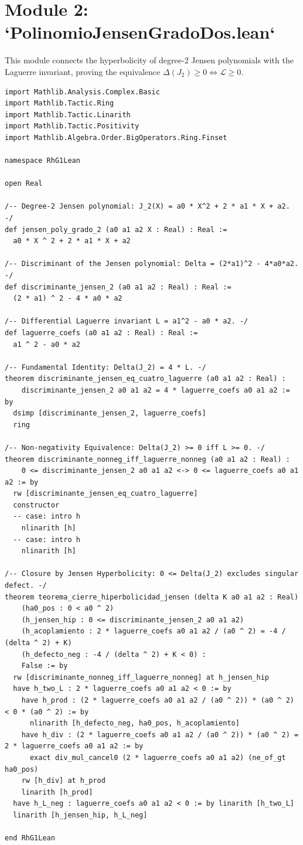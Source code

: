 \documentclass[11pt,a4paper]{article}
\theoremstyle{definition}
\theoremstyle{remark}
\begin{document}
\section{Module 2: `PolinomioJensenGradoDos.lean`}

This module connects the hyperbolicity of degree-2 Jensen polynomials with the Laguerre invariant, proving the equivalence $\Delta(J_2) \ge 0 \iff \mathcal{L} \ge 0$.

\begin{lstlisting}[language=Lean4]
import Mathlib.Analysis.Complex.Basic
import Mathlib.Tactic.Ring
import Mathlib.Tactic.Linarith
import Mathlib.Tactic.Positivity
import Mathlib.Algebra.Order.BigOperators.Ring.Finset

namespace RhG1Lean

open Real

/-- Degree-2 Jensen polynomial: J_2(X) = a0 * X^2 + 2 * a1 * X + a2. -/
def jensen_poly_grado_2 (a0 a1 a2 X : Real) : Real :=
  a0 * X ^ 2 + 2 * a1 * X + a2

/-- Discriminant of the Jensen polynomial: Delta = (2*a1)^2 - 4*a0*a2. -/
def discriminante_jensen_2 (a0 a1 a2 : Real) : Real :=
  (2 * a1) ^ 2 - 4 * a0 * a2

/-- Differential Laguerre invariant L = a1^2 - a0 * a2. -/
def laguerre_coefs (a0 a1 a2 : Real) : Real :=
  a1 ^ 2 - a0 * a2

/-- Fundamental Identity: Delta(J_2) = 4 * L. -/
theorem discriminante_jensen_eq_cuatro_laguerre (a0 a1 a2 : Real) :
    discriminante_jensen_2 a0 a1 a2 = 4 * laguerre_coefs a0 a1 a2 := by
  dsimp [discriminante_jensen_2, laguerre_coefs]
  ring

/-- Non-negativity Equivalence: Delta(J_2) >= 0 iff L >= 0. -/
theorem discriminante_nonneg_iff_laguerre_nonneg (a0 a1 a2 : Real) :
    0 <= discriminante_jensen_2 a0 a1 a2 <-> 0 <= laguerre_coefs a0 a1 a2 := by
  rw [discriminante_jensen_eq_cuatro_laguerre]
  constructor
  -- case: intro h
    nlinarith [h]
  -- case: intro h
    nlinarith [h]

/-- Closure by Jensen Hyperbolicity: 0 <= Delta(J_2) excludes singular defect. -/
theorem teorema_cierre_hiperbolicidad_jensen (delta K a0 a1 a2 : Real)
    (ha0_pos : 0 < a0 ^ 2)
    (h_jensen_hip : 0 <= discriminante_jensen_2 a0 a1 a2)
    (h_acoplamiento : 2 * laguerre_coefs a0 a1 a2 / (a0 ^ 2) = -4 / (delta ^ 2) + K)
    (h_defecto_neg : -4 / (delta ^ 2) + K < 0) :
    False := by
  rw [discriminante_nonneg_iff_laguerre_nonneg] at h_jensen_hip
  have h_two_L : 2 * laguerre_coefs a0 a1 a2 < 0 := by
    have h_prod : (2 * laguerre_coefs a0 a1 a2 / (a0 ^ 2)) * (a0 ^ 2) < 0 * (a0 ^ 2) := by
      nlinarith [h_defecto_neg, ha0_pos, h_acoplamiento]
    have h_div : (2 * laguerre_coefs a0 a1 a2 / (a0 ^ 2)) * (a0 ^ 2) = 2 * laguerre_coefs a0 a1 a2 := by
      exact div_mul_cancel0 (2 * laguerre_coefs a0 a1 a2) (ne_of_gt ha0_pos)
    rw [h_div] at h_prod
    linarith [h_prod]
  have h_L_neg : laguerre_coefs a0 a1 a2 < 0 := by linarith [h_two_L]
  linarith [h_jensen_hip, h_L_neg]

end RhG1Lean
\end{lstlisting}
\end{document}
